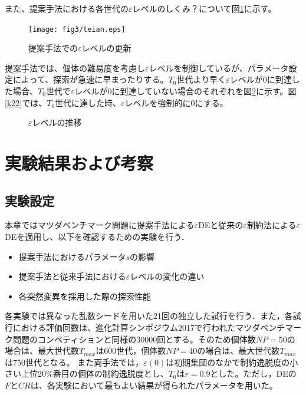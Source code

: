 \documentclass[a4paper,12pt]{jsreport}
\begin{document}
また、提案手法における各世代の$\varepsilon$レベルのしくみ？について図\ref{fig:teian}に示す。


\begin{figure}[htbp]
  \centering
  \texttt{[image: fig3/teian.eps]}
  \caption{提案手法での$\varepsilon$レベルの更新}
  \label{fig:teian}
\end{figure}

\newpage

提案手法では、個体の難易度を考慮し$\varepsilon$レベルを制御しているが、パラメータ設定によって、探索が急速に早まったりする。$T_{0}$世代より早く$\varepsilon$レベルが0に到達した場合、$T_{0}$世代で$\varepsilon$レベルが0に到達していない場合のそれぞれを図\ref{fig:nonipusilon}に示す。図\ref{k22}では、$T_{0}$世代に達した時、$\varepsilon$レベルを強制的に0にする。

\begin{figure}[htbp]
  \begin{center}
  \hfill
  \end{center}

  \caption{$\varepsilon$レベルの推移}
  \label{fig:nonipusilon}
\end{figure}





\chapter{実験結果および考察}

\section{実験設定}
本章ではマツダベンチマーク問題に提案手法による$\varepsilon$DEと従来の$\varepsilon$制約法による$\varepsilon$DEを適用し、以下を確認するための実験を行う．

\begin{itemize}
\item 提案手法におけるパラメータ$s$の影響

\item 提案手法と従来手法における$\varepsilon$レベルの変化の違い

\item 各突然変異を採用した際の探索性能
\end{itemize}
各実験では異なった乱数シードを用いた21回の独立した試行を行う．また，各試行における評価回数は、進化計算シンポジウム2017で行われたマツダベンチマーク問題のコンペティションと同様の30000回\cite{評価回数}とする。そのため個体数$NP=50$の場合は、最大世代数${T}_{max}$は600世代，個体数$NP=40$の場合は、最大世代数${T}_{max}$は750世代となる。
また両手法では，$\varepsilon(0)$は初期集団のなかで制約逸脱度の小さい上位$20$\%番目の個体の制約逸脱度とし、${T}_0$は$r=0.9$とした。ただし，DEの$FとCR$は、各実験において最もよい結果が得られたパラメータを用いた。
\end{document}
